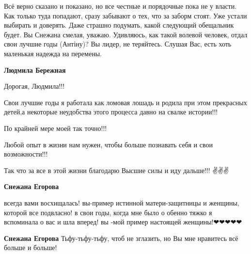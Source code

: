 \begin{itemize}
Всё верно сказано и показано, но все честные и порядочные пока не у власти. Как
только туда попадают, сразу забывают о тех, что за заборм стоят. Уже устали
выбирать и доверять. Даже страшно подумать, какой следующий обещальник будет.
Вы Снежана смелая, уважаю. Удивляюсь, как такой волевой человек, отдал свои
лучшие годы (Антіну)? Вы лидер, не теряйтесь. Слушая Вас, есть хоть маленькая
надежда на перемены.

\begin{itemize}
 
\textbf{Людмила Бережная} 

Дорогая, Людмила!!!

Свои лучшие годы я работала как ломовая лошадь и родила при этом прекрасных
детей,а некоторые неудобства этого процесса давно на свалке истории!!!

По крайней мере моей так точно!!!

Любой опыт в жизни нам нужен, чтобы больше познавать себя и свои возможности!!!

Так что за все в этой жизни благодарю Высшие силы и иду дальше!!!
✌️✌️✌️

 
\textbf{Снежана Егорова} 

всегда вами восхищалась! вы-пример истинной матери-защитницы и женщины, которой
все подвласно! в свои годы, когда мне было о обенно тяжко я вспоминала о вас и
шла вперед! вы -мой пример настоящей женщины!❤❤❤❤❤


 
\textbf{Снежана Егорова} Тьфу-тьфу-тьфу, чтоб не зглазить, но Вы мне нравитесь всё больше и больше!

 

\end{itemize}
\end{itemize}
